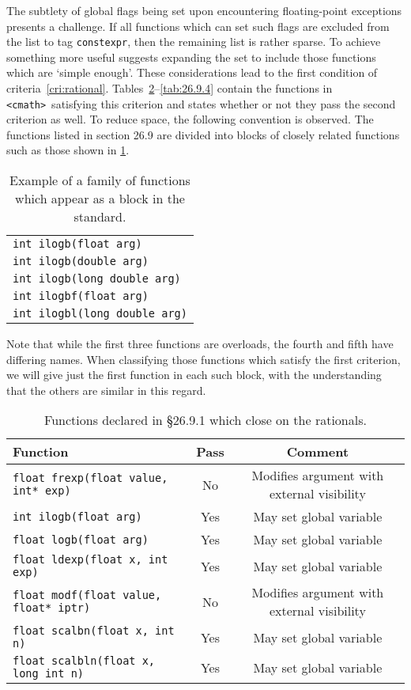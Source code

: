 \documentclass[prd,preprint,amsmath,amssymb,nofootinbib,eqsecnum]{revtex4-1}
\newcommand{\constexpr}{\code{constexpr}\xspace}
\newcommand{\code}[1]{{\tt #1}}
\newcommand{\header}[1]{{\tt <#1>}}
\newcommand{\cmath}{\header{cmath}}
\begin{document}
The subtlety of global flags being set upon encountering floating-point
exceptions presents a challenge. If all functions which can set such flags are
excluded from the list to tag \constexpr, then the remaining list is rather
sparse. To achieve something more useful suggests expanding the set to include
those functions which are `simple enough'. These considerations lead to the
first condition of criteria~\ref{cri:rational}.
Tables~\ref{tab:26.9.1}--\ref{tab:26.9.4} contain the functions in \cmath\
satisfying this criterion and states whether or not they pass the second
criterion as well. To reduce space, the following convention is observed. The
functions listed in section 26.9 are divided into blocks of closely related
functions such as those shown in \ref{tab:example}. 
\begin{table}
	\begin{tabular}{l}
		\code{int ilogb(float arg)}
	\\
		\code{int ilogb(double arg)}
	\\
		\code{int ilogb(long double arg)}
	\\
		\code{int ilogbf(float arg)}
	\\
		\code{int ilogbl(long double arg)}
	\end{tabular}
\caption{Example of a family of functions which appear as a block in the standard.}
\label{tab:example}
\end{table}
Note that while the first three functions are overloads, the fourth and fifth
have differing names.  When classifying those functions which satisfy the first
criterion, we will give just the first function in each such block, with the
understanding that the others are similar in this regard.

\begin{table}[h]
	\begin{tabular}{lcc}
		Function & Pass & Comment
	\\
	\hline \hline
		\code{float frexp(float value, int* exp)} & No & Modifies argument with external visibility
	\\
	\hline
		\code{int ilogb(float arg)} & Yes & May set global variable
	\\
	\hline
		\code{float logb(float arg)} & Yes & May set global variable
	\\
	\hline
		\code{float ldexp(float x, int exp)} & Yes & May set global variable
	\\
	\hline
		\code{float modf(float value, float* iptr)} & No & Modifies argument with external visibility
	\\
	\hline
		\code {float scalbn(float x, int n)} & Yes & May set global variable
	\\
	\hline
		\code {float scalbln(float x, long int n)} & Yes & May set global variable
	\end{tabular}
\caption{Functions declared in \S 26.9.1 which close on the rationals.}
\label{tab:26.9.1}
\end{table}
\end{document}
